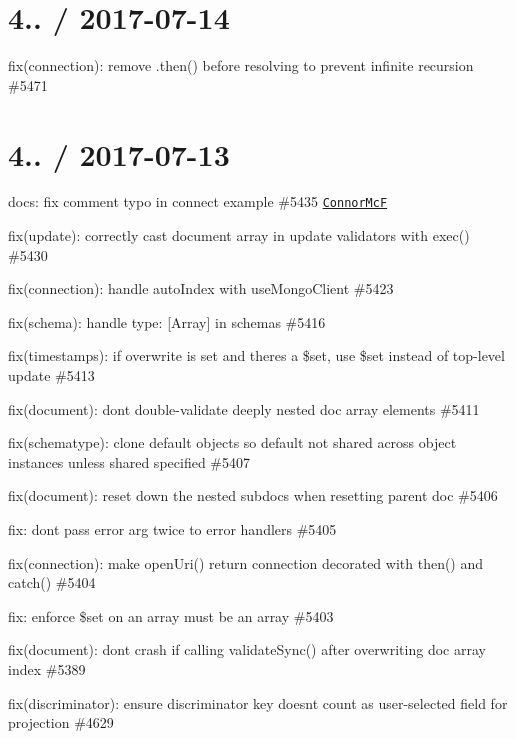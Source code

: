 \section*{4.. / 2017-\/07-\/14 }


\begin{DoxyItemize}
\item fix(connection)\+: remove .then() before resolving to prevent infinite recursion \#5471
\end{DoxyItemize}

\section*{4.. / 2017-\/07-\/13 }


\begin{DoxyItemize}
\item docs\+: fix comment typo in connect example \#5435 \href{https://github.com/ConnorMcF}{\tt Connor\+McF}
\item fix(update)\+: correctly cast document array in update validators with exec() \#5430
\item fix(connection)\+: handle auto\+Index with use\+Mongo\+Client \#5423
\item fix(schema)\+: handle {\ttfamily type\+: \mbox{[}Array\mbox{]}} in schemas \#5416
\item fix(timestamps)\+: if overwrite is set and there\textquotesingle{}s a \$set, use \$set instead of top-\/level update \#5413
\item fix(document)\+: don\textquotesingle{}t double-\/validate deeply nested doc array elements \#5411
\item fix(schematype)\+: clone default objects so default not shared across object instances unless {\ttfamily shared} specified \#5407
\item fix(document)\+: reset down the nested subdocs when resetting parent doc \#5406
\item fix\+: don\textquotesingle{}t pass error arg twice to error handlers \#5405
\item fix(connection)\+: make open\+Uri() return connection decorated with then() and catch() \#5404
\item fix\+: enforce \$set on an array must be an array \#5403
\item fix(document)\+: don\textquotesingle{}t crash if calling {\ttfamily validate\+Sync()} after overwriting doc array index \#5389
\item fix(discriminator)\+: ensure discriminator key doesn\textquotesingle{}t count as user-\/selected field for projection \#4629
\end{DoxyItemize}

